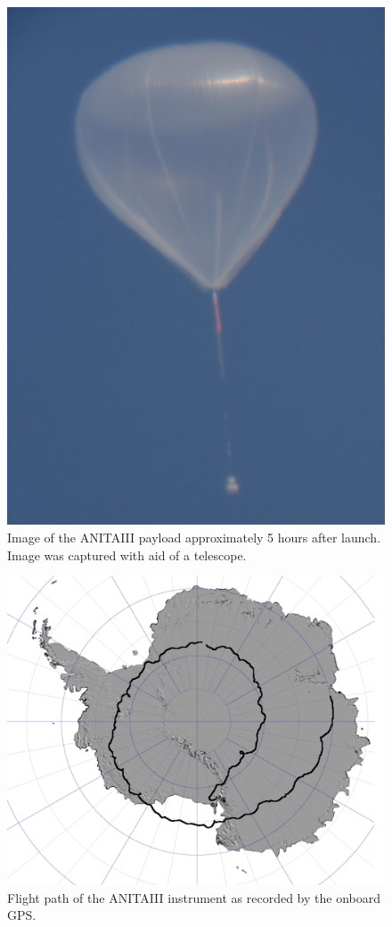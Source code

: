 		
\begin{figure}
\centering
	\includegraphics[height=0.9\textheight]{figures/CelestronBalloon}
	\caption{Image of the ANITAIII payload approximately 5 hours after launch. Image was captured with aid of a telescope. }
	\label{fig:Balloon}
\end{figure}

\begin{figure}
\centering
	\includegraphics[width=\textwidth]{figures/A3FlightPath}
	\caption{Flight path of the ANITAIII instrument as recorded by the onboard GPS.}
	\label{fig:A3FlightPath}
\end{figure}

